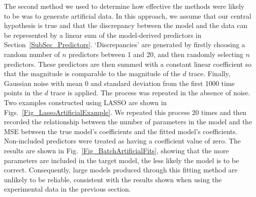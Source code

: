 \documentclass[11pt,a4paper,oneside]{article}
\begin{document}
The second method we used to determine how effective the methods were likely to be was to generate artificial data. In this approach, we assume that our central hypothesis is true and that the discrepancy between the model and the data can be represented by a linear sum of the model-derived predictors in Section~\ref{SubSec_Predictors}. `Discrepancies' are generated by firstly choosing a random number of $n$ predictors between 1 and 20, and then randomly selecting $n$ predictors. These predictors are then summed with a constant linear coefficient so that the magnitude is comparable to the magnitude of the $d$ trace. Finally, Gaussian noise with mean 0 and standard deviation from the first 1000 time points in the $d$ trace is applied. The process was repeated in the absence of noise. Two examples constructed using LASSO are shown in Figs.~\ref{Fig_LassoArtificialExample}. We repeated this process 20 times and then recorded the relationship between the number of parameters in the model and the MSE between the true model's coefficients and the fitted model's coefficients. Non-included predictors were treated as having a coefficient value of zero. The results are shown in Fig.~\ref{Fig_BatchArtificialFits}, showing that the more parameters are included in the target model, the less likely the model is to be correct. Consequently, large models produced through this fitting method are unlikely to be reliable, consistent with the results shown when using the experimental data in the previous section.
\end{document}
